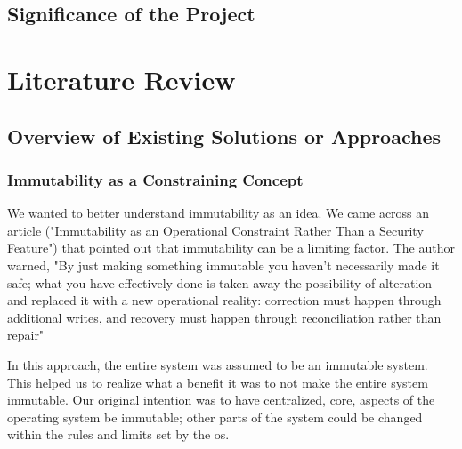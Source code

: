 \subsection{Significance of the Project}

\section{Literature Review}
\subsection{Overview of Existing Solutions or Approaches}

\subsubsection{Immutability as a Constraining Concept}
We wanted to better understand immutability as an idea.  We came across an article ("Immutability as an Operational Constraint Rather Than a
Security Feature")  that pointed out that immutability can be a limiting factor.  The author warned, "By just making something immutable you haven't necessarily made it safe; what you have effectively done is taken away the possibility of alteration and replaced it with a new operational reality: correction must happen through additional writes, and recovery must happen through reconciliation rather than repair"

In this approach, the entire system was assumed to be an \gls{immutable system}.  This helped us to realize what a benefit it was to not make the entire system immutable.  Our original intention was to have centralized, core, aspects of the \gls{operating system} be immutable; other parts of the system could be changed within the rules and limits set by the \gls{os}.

